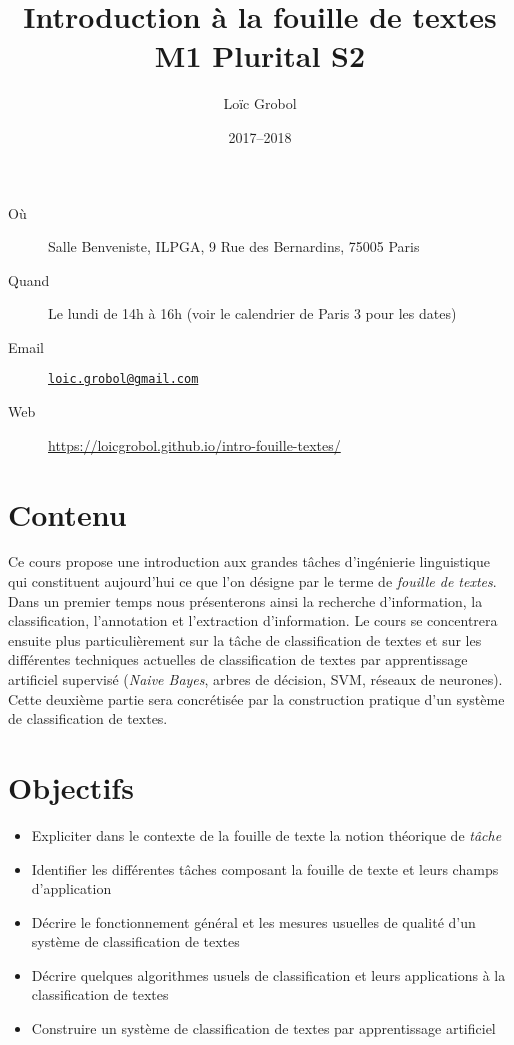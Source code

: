 \documentclass[a4paper, 11pt]{article}
\title{Introduction à la fouille de textes\\M1 Plurital S2}
\author{Loïc Grobol}
\date{2017–2018}
\begin{document}
\vspace*{-7em}
{\let\newpage\relax\maketitle}
\thispagestyle{main}

\begin{description}
    \item[Où] Salle Benveniste, ILPGA, 9 Rue des Bernardins, 75005 Paris
    \item[Quand] Le lundi de 14h à 16h (voir le calendrier de Paris 3 pour les dates)
    \item[Email] \href{mailto:loic.grobol@gmail.com}{\texttt{loic.grobol@gmail.com}}
    \item[Web] \url{https://loicgrobol.github.io/intro-fouille-textes/}
\end{description}

\section*{Contenu}
Ce cours propose une introduction aux grandes tâches d'ingénierie linguistique qui constituent aujourd'hui ce que l'on désigne par le terme de \emph{fouille de textes}.
Dans un premier temps nous présenterons ainsi la recherche d'information, la classification, l'annotation et l'extraction d'information.
Le  cours se  concentrera ensuite plus particulièrement sur la tâche de classification de textes et sur les différentes techniques actuelles de classification de textes par apprentissage artificiel supervisé (\emph{Naive Bayes}, arbres de décision, SVM, réseaux de neurones).
Cette deuxième partie sera concrétisée par la construction pratique d'un système de classification de textes.

\section*{Objectifs}

\begin{itemize}
    \item Expliciter dans le contexte de la fouille de texte la notion théorique de \emph{tâche}
    \item Identifier les différentes tâches composant la fouille de texte et leurs champs d'application
    \item Décrire le fonctionnement général et les mesures usuelles de qualité d'un système de classification de textes
    \item Décrire quelques algorithmes usuels de classification et leurs applications à la classification de textes
    \item Construire un système de classification de textes par apprentissage artificiel
\end{itemize}
\end{document}
